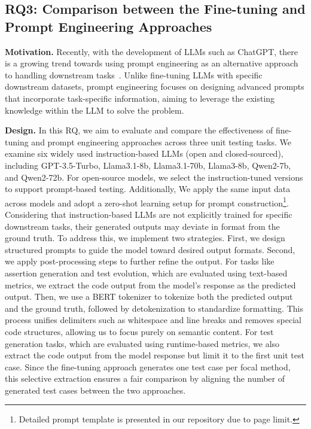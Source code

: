 \subsection{RQ3: Comparison between the Fine-tuning and Prompt Engineering Approaches}
\label{sec:rq3}

\textbf{Motivation.}
Recently, with the development of LLMs such as ChatGPT, there is a growing trend towards using prompt engineering as an alternative approach to handling downstream tasks~\cite{wang_software_2024}. Unlike fine-tuning LLMs with specific downstream datasets, prompt engineering focuses on designing advanced prompts that incorporate task-specific information, aiming to leverage the existing knowledge within the LLM to solve the problem. 

\textbf{Design.}
In this RQ, we aim to evaluate and compare the effectiveness of fine-tuning and prompt engineering approaches across three unit testing tasks. We examine six widely used instruction-based LLMs (open and closed-sourced), including GPT-3.5-Turbo, Llama3.1-8b, Llama3.1-70b, Llama3-8b, Qwen2-7b, and Qwen2-72b. For open-source models, we select the instruction-tuned versions to support prompt-based testing. 
Additionally, We apply the same input data across models and adopt a zero-shot learning setup for prompt construction\footnote{Detailed prompt template is presented in our repository due to page limit.}.
Considering that instruction-based LLMs are not explicitly trained for specific downstream tasks, their generated outputs may deviate in format from the ground truth. To address this, we implement two strategies. First, we design structured prompts to guide the model toward desired output formats. Second, we apply post-processing steps to further refine the output.
For tasks like assertion generation and test evolution, which are evaluated using text-based metrics, we extract the code output from the model’s response as the predicted output. Then, we use a BERT tokenizer to tokenize both the predicted output and the ground truth, followed by detokenization to standardize formatting. This process unifies delimiters such as whitespace and line breaks and removes special code structures, allowing us to focus purely on semantic content.
For test generation tasks, which are evaluated using runtime-based metrics, we also extract the code output from the model response but limit it to the first unit test case. Since the fine-tuning approach generates one test case per focal method, this selective extraction ensures a fair comparison by aligning the number of generated test cases between the two approaches.

